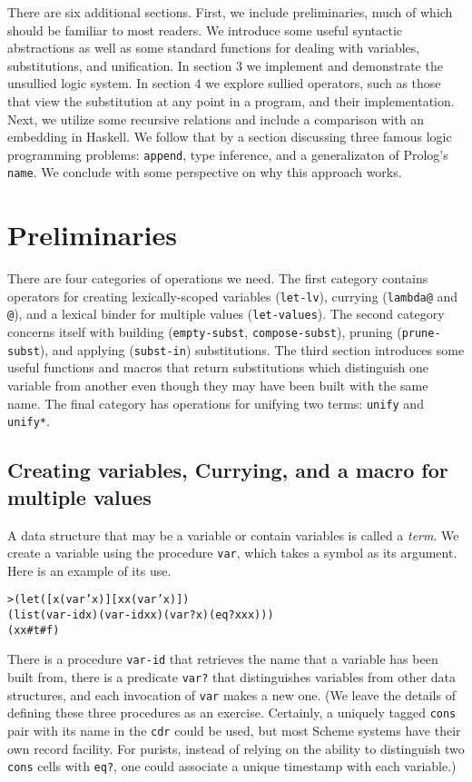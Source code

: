 There are six additional sections.  First, we include preliminaries,
much of which should be familiar to most readers.  We introduce some
useful syntactic abstractions as well as some standard functions for
dealing with variables, substitutions, and unification.  In section 3
we implement and demonstrate the unsullied logic system.  In section 4
we explore sullied operators, such as those that view the substitution
at any point in a program, and their implementation. Next, we utilize
some recursive relations and include a comparison with an embedding in
Haskell.  We follow that by a section discussing three famous logic
programming problems: \texttt{append}, type inference, and a
generalizaton of Prolog's \texttt{name}.  We conclude with some
perspective on why this approach works.

\section{Preliminaries}

There are four categories of operations we need.  The first category
contains operators for creating lexically-scoped variables
(\texttt{let-lv}), currying (\texttt{lambda@} and \texttt{@}), and a
lexical binder for multiple values (\texttt{let-values}).  The second
category concerns itself with building (\texttt{empty-subst},
\texttt{compose-subst}), pruning (\texttt{prune-subst}), and applying
(\texttt{subst-in}) substitutions.  The third section introduces some
useful functions and macros that return substitutions which
distinguish one variable from another even though they may have been
built with the same name.  The final category has operations for
unifying two terms: \texttt{unify} and \texttt{unify*}.

\subsection{Creating variables, Currying, and a macro for multiple values}

A data structure that may be a variable or contain variables is called
a \emph{term}.  We create a variable using the procedure \texttt{var},
which takes a symbol as its argument. Here is an example of its use.

\begin{alltt}
> (let ([x (var 'x)] [xx (var 'x)])
    (list (var-id x) (var-id xx) (var? x) (eq? x xx)))
(x x #t #f)
\end{alltt}

\noindent
There is a procedure \texttt{var-id} that retrieves the name that a
variable has been built from, there is a predicate \texttt{var?} that
distinguishes variables from other data structures, and each
invocation of \texttt{var} makes a new one.  (We leave the details of
defining these three procedures as an exercise.  Certainly, a uniquely
tagged \texttt{cons} pair with its name in the \texttt{cdr} could be
used, but most Scheme systems have their own record facility.  For
purists, instead of relying on the ability to distinguish two
\texttt{cons} cells with \texttt{eq?}, one could associate a unique
timestamp with each variable.)

